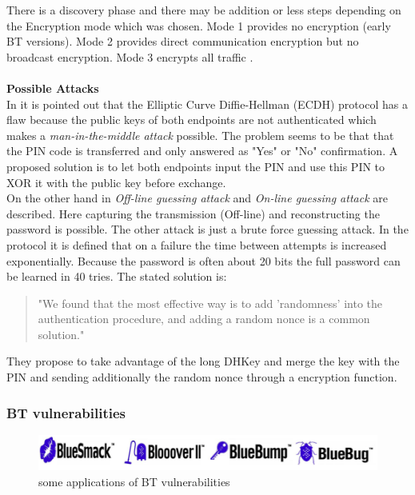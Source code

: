 \documentclass[12pt,a4paper]{article}
\begin{document}
There is a discovery phase and there may be addition or less steps depending on the Encryption mode which was chosen. Mode 1 provides no encryption (early BT versions). Mode 2 provides direct communication encryption but no broadcast encryption. Mode 3 encrypts all traffic \cite{DBLP:journals/ijnsec/Lackner13}. 
\\
\\
\textbf{Possible Attacks}\\
In \cite{DBLP:journals/ijnsec/YehPWH12} it is pointed out that the Elliptic Curve Diffie-Hellman (ECDH) protocol has a flaw because the public keys of both endpoints are not authenticated which makes a \emph{man-in-the-middle attack} possible. The problem seems to be that that the PIN code is transferred and only answered as "Yes" or "No" confirmation. A proposed solution is to let both endpoints input the PIN and use this PIN to XOR it with the public key before exchange.\\
On the other hand in \cite{DBLP:conf/apnoms/FanSL11} \emph{Off-line guessing attack} and \emph{On-line guessing attack} are described. Here capturing the transmission (Off-line) and reconstructing the password is possible. The other attack is just a brute force guessing attack. In the protocol it is defined that on a failure the time between attempts is increased exponentially. Because the password is often about 20 bits the full password can be learned in 40 tries. The stated solution is:
\begin{quote}
"We found that the most effective way is to add 'randomness' into the authentication procedure, and adding a random nonce is a common solution."\cite{DBLP:conf/apnoms/FanSL11}
\end{quote}
They propose to take advantage of the long DHKey and merge the key with the PIN and sending additionally the random nonce through a encryption function.

\subsubsection{BT vulnerabilities}

\begin{figure}[h]
\begin{center}
\includegraphics[scale=0.4]{img/bt_attack_logos.png}
\caption{some applications of BT vulnerabilities \cite{DBLP:journals/corr/abs-1206-1482}}
\label{img_bt_attack_logos}
\end{center}
\end{figure}
\end{document}
